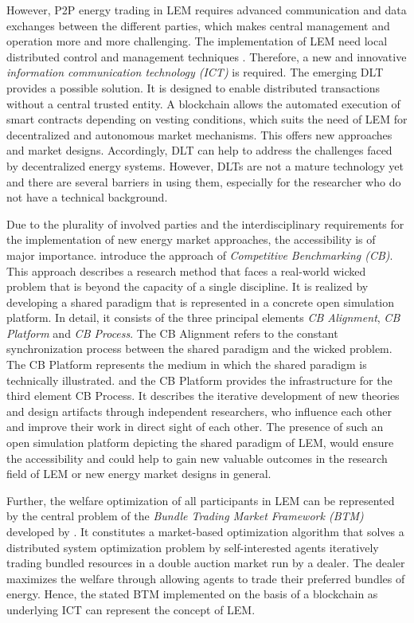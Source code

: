 However, P2P energy trading in LEM requires advanced communication and data exchanges between the different parties, 
which makes central management and operation more and more challenging. The implementation of LEM need local 
distributed control and management techniques . 
Therefore, a new and innovative \textit{information communication technology (ICT)} is required.  
The emerging DLT provides a possible solution. 
It is designed to enable distributed transactions without a central trusted entity. 
A blockchain allows the automated execution of smart contracts depending 
on vesting conditions, which suits the need of LEM for decentralized and autonomous market mechanisms. 
This offers new approaches and market designs. Accordingly, DLT can help to address the challenges 
faced by decentralized energy systems. However, DLTs are not a mature technology yet and 
there are several barriers in using them, especially for the researcher who do not have a technical background. 

Due to the plurality of involved parties and the interdisciplinary requirements for the 
implementation of new energy market approaches, the accessibility is of major importance.
 introduce the approach of \textit{Competitive Benchmarking (CB)}. 
This approach describes a research method that faces a real-world wicked problem that is beyond the capacity of a single discipline. 
It is realized by developing a shared paradigm that is represented in a concrete open simulation platform. 
In detail, it consists of the three principal elements \textit{CB Alignment}, \textit{CB Platform} and \textit{CB Process}. 
The CB Alignment refers to the constant synchronization process between the shared paradigm and the wicked problem. 
The CB Platform represents the medium in which the shared paradigm is technically illustrated. 
and the CB Platform provides the infrastructure for the third element CB Process. 
It describes the iterative development of new theories and design artifacts through independent researchers, 
who influence each other and improve their work in direct sight of each other.
The presence of such an open simulation platform depicting the shared paradigm of LEM, 
would ensure the accessibility and could help to gain new valuable outcomes in the research field 
of LEM or new energy market designs in general.

Further, the welfare optimization of all participants in LEM can be represented by the 
central problem of the \textit{Bundle Trading Market Framework (BTM)} developed by .
It constitutes a market-based optimization algorithm
that solves a distributed system optimization problem by self-interested agents iteratively 
trading bundled resources in a double auction market run by a dealer.
The dealer maximizes the welfare through allowing agents 
to trade their preferred bundles of energy. Hence, the stated BTM implemented on the basis of a 
blockchain as underlying ICT can represent the concept of LEM.

